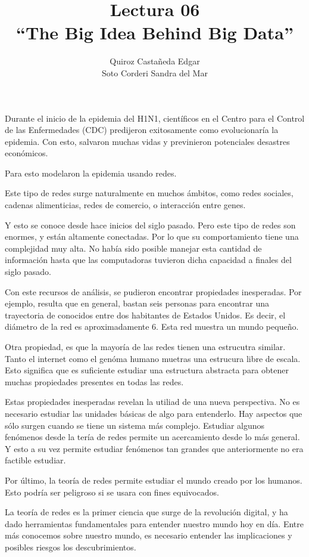 \documentclass[12pt]{extreport}
\title{
	Lectura 06\\ 
	``The Big Idea Behind Big Data''
	}
\author{
	Quiroz Castañeda Edgar \\
	Soto Corderi Sandra del Mar
	}
\makeatletter
\renewcommand{\maketitle}{
	\bgroup\setlength{\parindent}{0pt}

	\begin{flushright}
		\@author
	\end{flushright}

	\begin{flushleft}
		\textbf{\@title}
	\end{flushleft}

	\egroup
}
\makeatother
\begin{document}
	\maketitle
	
	Durante el inicio de la epidemia del H1N1, científicos en el Centro para el
	Control de las Enfermedades (CDC) predijeron exitosamente como evolucionaría
	la epidemia. Con esto, salvaron muchas vidas y previnieron potenciales 
	desastres económicos.

	Para esto modelaron la epidemia usando redes. 
	
	Este tipo de redes surge naturalmente en muchos ámbitos, como redes 
	sociales, cadenas alimenticias, redes de comercio, o interacción entre 
	genes.

	Y esto se conoce desde hace inicios del siglo pasado. Pero este tipo de 
	redes son enormes, y están altamente conectadas. Por lo que su 
	comportamiento tiene una complejidad muy alta. 	No había sido posible 
	manejar esta cantidad de información hasta que las computadoras tuvieron 
	dicha capacidad a finales del siglo pasado.

	Con este recursos de análisis, se pudieron encontrar propiedades inesperadas.
	Por ejemplo, resulta que en general, bastan seis personas para encontrar una
	trayectoria de conocidos entre dos habitantes de Estados Unidos. Es decir, 
	el diámetro de la red es aproximadamente 6. Esta red muestra un mundo 
	pequeño.

	Otra propiedad, es que la mayoría de las redes tienen una estrucutra 
	similar. Tanto el internet como el genóma humano muetras una estrucura libre
	de escala. Esto significa que es suficiente estudiar una estructura 
	abstracta para obtener muchas propiedades presentes en todas las redes.

	Estas propiedades inesperadas revelan la utiliad de una nueva perspectiva. 
	No es necesario estudiar las unidades básicas de algo para entenderlo. Hay 
	aspectos que sólo surgen cuando se tiene un sistema más complejo. Estudiar 
	algunos fenómenos desde la tería de redes permite un acercamiento desde lo
	más general. Y esto a su vez permite estudiar fenómenos tan grandes que 
	anteriormente no era factible estudiar.

	Por último, la teoría de redes permite estudiar el mundo creado por los 
	humanos. Esto podría ser peligroso si se usara con fines equivocados.

	La teoría de redes es la primer ciencia que surge de la revolución digital, 
	y ha dado herramientas fundamentales para entender nuestro mundo hoy en día.
	Entre más conocemos sobre nuestro mundo, es necesario entender las 
	implicaciones y posibles riesgos los descubrimientos.
	
\end{document}
